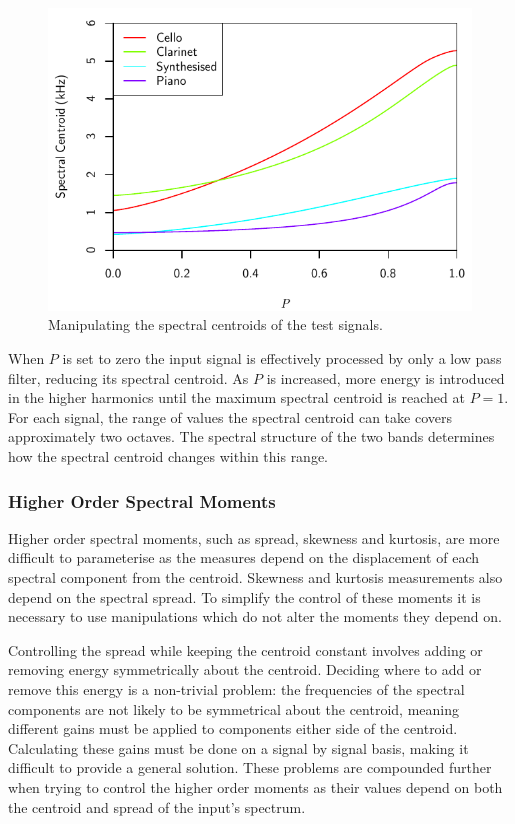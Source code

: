 			\begin{figure}[h!]
				\centering
				\includegraphics{chapter6/Images/MoveCentroids.pdf}
				\caption{Manipulating the spectral centroids of the test signals.}
				\label{fig:MoveCentroids}
			\end{figure}

			When $P$ is set to zero the input signal is effectively processed by only a low pass filter,
			reducing its spectral centroid. As $P$ is increased, more energy is introduced in the higher
			harmonics until the maximum spectral centroid is reached at $P = 1$. For each signal, the range of
			values the spectral centroid can take covers approximately two octaves. The spectral structure of
			the two bands determines how the spectral centroid changes within this range.

		\subsubsection*{Higher Order Spectral Moments}
			Higher order spectral moments, such as spread, skewness and kurtosis, are more difficult to
			parameterise as the measures depend on the displacement of each spectral component from the
			centroid. Skewness and kurtosis measurements also depend on the spectral spread. To simplify the
			control of these moments it is necessary to use manipulations which do not alter the moments they
			depend on. 
			
			Controlling the spread while keeping the centroid constant involves adding or removing energy
			symmetrically about the centroid. Deciding where to add or remove this energy is a non-trivial
			problem: the frequencies of the spectral components are not likely to be symmetrical about the
			centroid, meaning different gains must be applied to components either side of the centroid.
			Calculating these gains must be done on a signal by signal basis, making it difficult to provide a
			general solution. These problems are compounded further when trying to control the higher order
			moments as their values depend on both the centroid and spread of the input's spectrum.

